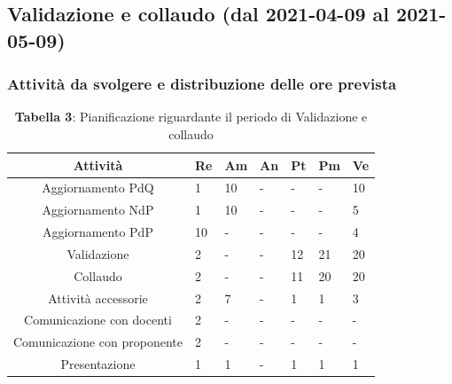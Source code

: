 \subsection{Validazione e collaudo (dal 2021-04-09 al 2021-05-09)}


\subsubsection{Attività da svolgere e distribuzione delle ore prevista}
\begin{table}[H]
	\centering
	\renewcommand{\arraystretch}{1.5}
	\begin{tabular}{|c|p{10mm}|p{10mm}|p{10mm}|p{10mm}|p{10mm}|p{10mm}|}
		\hline
		\rowcolor{lighter-grayer}
		Attività & Re & Am & An & Pt & Pm & Ve \\ \hline
		Aggiornamento PdQ          & 1  & 10 & - & - & - & 10 \\ \hline
		Aggiornamento NdP          & 1  & 10 & - & - & - & 5  \\ \hline
		Aggiornamento PdP          & 10 & - & - & - & - & 4  \\ \hline
		Validazione                & 2  & - & - & 12 & 21 & 20 \\ \hline
		Collaudo                   & 2  & - & - & 11 & 20 & 20 \\ \hline
		Attività accessorie 	   & 2  & 7  & - & 1  & 1  & 3  \\ \hline
		Comunicazione con docenti  & 2  & - & - & - & - & -   \\ \hline
		Comunicazione con proponente& 2  & - & - & - & - & -   \\ \hline
		Presentazione              & 1  & 1  & - & 1  & 1  & 1 \\
		\hline
	\end{tabular}
	\caption*{\textbf{Tabella 3}: Pianificazione riguardante il periodo di Validazione e collaudo\\}
\end{table}